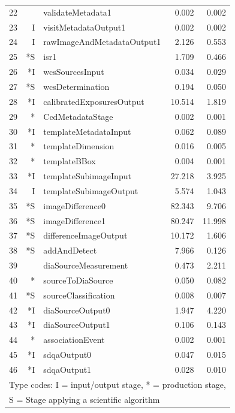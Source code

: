 \begin{table}[p]
\begin{center}
\begin{tabular}{lrlrr}
22 &    &             validateMetadata1 &  0.002 &  0.002 \\
23 &  I &          visitMetadataOutput1 &  0.002 &  0.002 \\
24 &  I &    rawImageAndMetadataOutput1 &  2.126 &  0.553 \\
25 & *S &                          isr1 &  1.709 &  0.466 \\
26 & *I &               wcsSourcesInput &  0.034 &  0.029 \\
27 & *S &              wcsDetermination &  0.194 &  0.050 \\
28 & *I &     calibratedExposuresOutput & 10.514 &  1.819 \\
29 & *\phantom{I}  &              CcdMetadataStage &  0.002 &  0.001 \\
30 & *I &         templateMetadataInput &  0.062 &  0.089 \\
31 & *\phantom{I}  &             templateDimension &  0.016 &  0.005 \\
32 & *\phantom{I}  &                  templateBBox &  0.004 &  0.001 \\
33 & *I &         templateSubimageInput & 27.218 &  3.925 \\
34 &  I &        templateSubimageOutput &  5.574 &  1.043 \\
35 & *S &              imageDifference0 & 82.343 &  9.706 \\
36 & *S &              imageDifference1 & 80.247 & 11.998 \\
37 & *S &         differenceImageOutput & 10.172 &  1.606 \\
38 & *S &                  addAndDetect &  7.966 &  0.126 \\
39 &    &          diaSourceMeasurement &  0.473 &  2.211 \\
40 & *\phantom{I}  &             sourceToDiaSource &  0.050 &  0.082 \\
41 & *S &          sourceClassification &  0.008 &  0.007 \\
42 & *I &              diaSourceOutput0 &  1.947 &  4.220 \\
43 & *I &              diaSourceOutput1 &  0.106 &  0.143 \\
44 & *\phantom{I}  &              associationEvent &  0.002 &  0.001 \\
45 & *I &                   sdqaOutput0 &  0.047 &  0.015 \\
46 & *I &                   sdqaOutput1 &  0.028 &  0.010 \\
\hline
\multicolumn{5}{l}{Type codes: I = input/output stage, * = production stage,} \\
\multicolumn{5}{l}{S = Stage applying a scientific algorithm} \\
\end{tabular}
\end{center}
\end{table}


